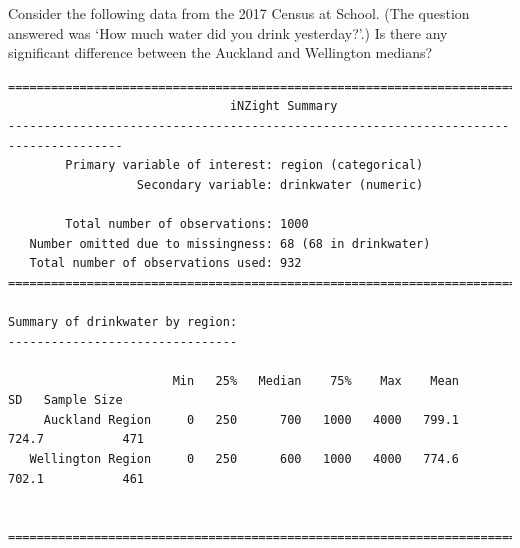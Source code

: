 \begin{questions}
\begin{parts}
    \end{parts}
  \question Consider the following data from the 2017 Census at School. (The question answered was `How much water did you drink yesterday?'.) Is
            there any significant difference between the Auckland and Wellington medians?
\begin{verbatim}
======================================================================================
                               iNZight Summary
--------------------------------------------------------------------------------------
        Primary variable of interest: region (categorical)
                  Secondary variable: drinkwater (numeric)

        Total number of observations: 1000
   Number omitted due to missingness: 68 (68 in drinkwater)
   Total number of observations used: 932
======================================================================================

Summary of drinkwater by region:
--------------------------------

                       Min   25%   Median    75%    Max    Mean      SD   Sample Size
     Auckland Region     0   250      700   1000   4000   799.1   724.7           471
   Wellington Region     0   250      600   1000   4000   774.6   702.1           461


======================================================================================
\end{verbatim}


\end{questions}
